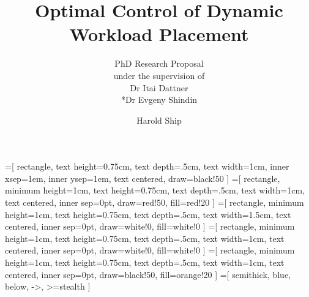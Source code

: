 \documentclass[pdf]{beamer}
\title{Optimal Control of Dynamic Workload Placement}
\subtitle{PhD Research Proposal \\ under the supervision of \\ Dr Itai Dattner \\ *Dr Evgeny Shindin}
\author{Harold Ship}
\institute{University of Haifa}
\theoremstyle{definition}
\begin{document}
=[%
rectangle,
text height=0.75cm,
text depth=.5cm,
text width=1cm,
inner xsep=1em,
inner ysep=1em,
text centered,
draw=black!50
]
=[%
rectangle,
minimum height=1cm,
text height=0.75cm,
text depth=.5cm,
text width=1cm,
text centered,
inner sep=0pt,
draw=red!50,
fill=red!20
]
=[%
rectangle,
minimum height=1cm,
text height=0.75cm,
text depth=.5cm,
text width=1.5cm,
text centered,
inner sep=0pt,
draw=white!0,
fill=white!0
]
=[%
rectangle,
minimum height=1cm,
text height=0.75cm,
text depth=.5cm,
text width=1cm,
text centered,
inner sep=0pt,
draw=white!0,
fill=white!0
]
=[%
rectangle,
minimum height=1cm,
text height=0.75cm,
text depth=.5cm,
text width=1cm,
text centered,
inner sep=0pt,
draw=black!50,
fill=orange!20
]
=[%
semithick,
blue,
below,
->,
>=stealth
]



\end{document}
